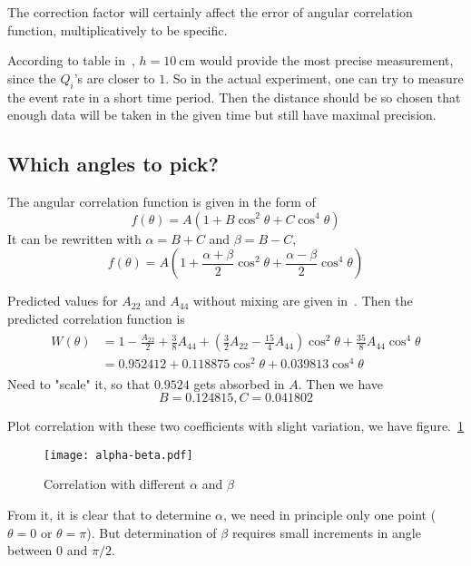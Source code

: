 The correction factor will certainly affect the error of angular correlation function, multiplicatively to be specific.

According to table in~\cite{siegbahn}, $h=\SI{10}{\cm}$ would provide the most precise measurement, since the $Q_i$'s are closer to $1$. So in the actual experiment, one can try to measure the event rate in a short time period. Then the distance should be so chosen that enough data will be taken in the given time but still have maximal precision.

\subsection{Which angles to pick?}
The angular correlation function is given in the form of~\cite{descr}
\begin{equation}
   f(\theta) = A(1 + B \cos^2\theta + C \cos^4 \theta)
   \label{math:fTheta}
\end{equation}
It can be rewritten with $\alpha= B + C$ and $\beta = B-C$,
\begin{equation}
   f(\theta) = A \left( 1 + \frac{\alpha + \beta}{ 2} \cos^2\theta + \frac{\alpha-\beta}{2} \cos^4 \theta \right)
\end{equation}

Predicted values for $A_{22}$ and $A_{44}$ without mixing are given in~\cite{siegbahn}. Then the predicted correlation function is
\begin{align}
   \begin{split}
   W(\theta) &= 1 - \frac{A_{22}}{2} + \frac{3}{8} A_{44} + \left( \frac{3}{2} A_{22} - \frac{15}{4} A_{44} \right) \cos^2 \theta + \frac{35}{8} A_{44} \cos^4 \theta \\
   &= 0.952412 + 0.118875 \cos^2 \theta + 0.039813 \cos^4 \theta
   \end{split}\label{math:pred}
\end{align}
Need to "scale" it, so that $0.9524$ gets absorbed in $A$. Then we have
\begin{equation*}
   B=0.124815, C=0.041802
\end{equation*}

Plot correlation with these two coefficients with slight variation, we have figure.~\ref{fig:alpha-beta}
\begin{figure}[ht]
   \centering
   \texttt{[image: alpha-beta.pdf]}
   \caption{Correlation with different $\alpha$ and $\beta$}%
   \label{fig:alpha-beta}
\end{figure}
From it, it is clear that to determine $\alpha$, we need in principle only one point ($\theta=0$ or $\theta=\pi$). But determination of $\beta$  requires small increments in angle between $0$ and $\pi/2$.

